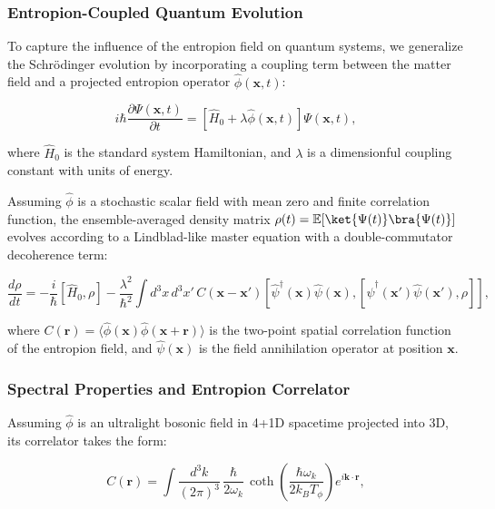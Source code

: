 \documentclass[12pt]{article}
\begin{document}
\subsubsection*{Entropion-Coupled Quantum Evolution}

To capture the influence of the entropion field on quantum systems, we generalize the Schrödinger evolution by incorporating a coupling term between the matter field and a projected entropion operator $\hat{\phi}(\mathbf{x}, t)$:

\begin{equation}
i\hbar \frac{\partial \Psi(\mathbf{x}, t)}{\partial t} = \left[ \hat{H}_0 + \lambda \hat{\phi}(\mathbf{x}, t) \right] \Psi(\mathbf{x}, t),
\label{eq:entropion_modified_schrodinger}
\end{equation}

where $\hat{H}_0$ is the standard system Hamiltonian, and $\lambda$ is a dimensionful coupling constant with units of energy.

Assuming $\hat{\phi}$ is a stochastic scalar field with mean zero and finite correlation function, the ensemble-averaged density matrix $\rho(t) = \mathbb{E}[\ket{\Psi(t)}\bra{\Psi(t)}]$ evolves according to a Lindblad-like master equation with a double-commutator decoherence term:

\begin{equation}
\frac{d\rho}{dt} = -\frac{i}{\hbar} [\hat{H}_0, \rho] - \frac{\lambda^2}{\hbar^2} \int d^3x \, d^3x' \, C(\mathbf{x} - \mathbf{x}') \left[ \hat{\psi}^\dagger(\mathbf{x}) \hat{\psi}(\mathbf{x}), \left[ \hat{\psi}^\dagger(\mathbf{x}') \hat{\psi}(\mathbf{x}'), \rho \right] \right],
\label{eq:entropion_master_equation}
\end{equation}

where $C(\mathbf{r}) = \langle \hat{\phi}(\mathbf{x}) \hat{\phi}(\mathbf{x} + \mathbf{r}) \rangle$ is the two-point spatial correlation function of the entropion field, and $\hat{\psi}(\mathbf{x})$ is the field annihilation operator at position $\mathbf{x}$.

\subsubsection*{Spectral Properties and Entropion Correlator}

Assuming $\hat{\phi}$ is an ultralight bosonic field in 4+1D spacetime projected into 3D, its correlator takes the form:

\begin{equation}
C(\mathbf{r}) = \int \frac{d^3k}{(2\pi)^3} \, \frac{\hbar}{2\omega_k} \, \coth\left( \frac{\hbar \omega_k}{2k_B T_\phi} \right) e^{i \mathbf{k} \cdot \mathbf{r}},
\label{eq:entropion_correlator}
\end{equation}
\end{document}
